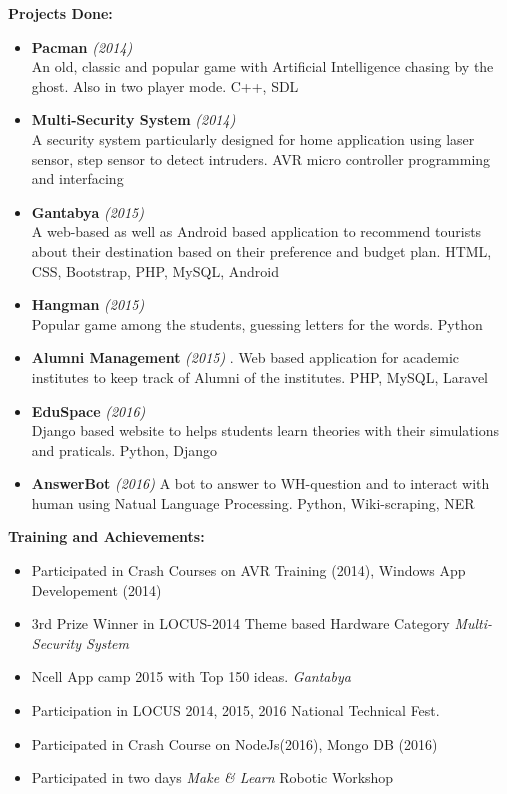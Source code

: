 \documentclass[paper = a4paper, 12pt]{article}
\begin{document}
{\Large \textbf{Projects Done:} \\
}
\begin{itemize}
	\item \textbf{Pacman } \emph{(2014)} \\
		\small An old, classic and popular game with Artificial Intelligence
		chasing by the ghost. Also in two player mode. C++, SDL
	\item \textbf{Multi-Security System} \emph{(2014)} \\
		\small A security system particularly designed for home application
		using laser sensor, step sensor to detect intruders. AVR 
		micro controller programming and interfacing
	\item \textbf{Gantabya} \emph{(2015)} \\
		\small A web-based as well as Android based application to recommend
		tourists about their destination based on their preference and budget
		plan. HTML, CSS, Bootstrap, PHP, MySQL, Android
	\item \textbf{Hangman} \emph{(2015)} \\
		\small Popular game among the students, guessing letters for the 
		words. Python
	\item \textbf{Alumni Management} \emph{(2015)}
		\small. Web based application for academic institutes to keep 
		track of Alumni of the institutes. PHP, MySQL, Laravel
	\item \textbf{EduSpace} \emph{(2016)} \\
		\small Django based website to helps students learn theories with
		their simulations and praticals. Python, Django
	\item \textbf{AnswerBot} \emph{(2016)}
		\small A bot to answer to WH-question and to interact with human
		using Natual Language Processing. Python, Wiki-scraping, NER
\end{itemize}

{\Large \textbf{ Training and Achievements: }\\ }
\begin{itemize}
	\item  Participated in Crash Courses on AVR Training (2014), Windows 
	App Developement (2014)
	\item 3rd Prize Winner in LOCUS-2014 Theme based Hardware Category 
	\emph{Multi-Security System}
	\item Ncell App camp 2015 with Top 150 ideas. \emph{Gantabya}
	\item Participation in LOCUS 2014, 2015, 2016 National Technical Fest. 
	\item Participated in Crash Course on NodeJs(2016), Mongo DB (2016) 
	\item Participated in two days \emph{Make \& Learn } Robotic Workshop
\end{itemize}
\end{document}
